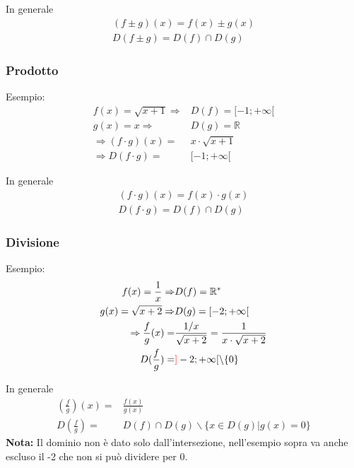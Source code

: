 \documentclass[../main.tex]{subfiles}
\begin{document}
In generale
\begin{align*}
    (f\pm g)(x) = f(x)\pm g(x)\\
    D(f\pm g) = D(f) \cap D(g) 
\end{align*}

\subsubsection{Prodotto}
Esempio:
\begin{align*}
    f(x) = \sqrt{x + 1} \Rightarrow& D(f) = [-1; +\infty[ \\
    g(x) = x \Rightarrow& D(g) = \mathbb{R} \\
    \Rightarrow (f \cdot g)(x) =& x \cdot \sqrt{x + 1} \\
    \Rightarrow D(f \cdot g) =& [-1;+\infty[
\end{align*}

In generale
\begin{align*}
    (f \cdot g)(x) = f(x) \cdot g(x) \\
    D(f \cdot g) = D(f) \cap D(g)  
\end{align*}

\subsubsection{Divisione}
Esempio:
\begin{align*}
    f(x) = \frac{1}{x} \Rightarrow& D(f) = \mathbb{R}^* \\
    g(x) = \sqrt{x + 2} \Rightarrow& D(g) = [-2;+\infty[ \\
    \Rightarrow \frac{f}{g}(x) =& \frac{1/x}{\sqrt{x + 2}} = \frac{1}{x \cdot \sqrt{x + 2}} \\
    D(\frac{f}{g}) =& \color{red}]\color{black}-2;+\infty[\backslash \{0\}
\end{align*}

In generale
\begin{align*}
    (\frac{f}{g})(x) =& \frac{f(x)}{g(x)} \\
    D(\frac{f}{g}) =& D(f) \cap D(g) \backslash \{x \in D(g) | g(x) = 0\}
\end{align*}
\textbf{Nota:} Il dominio non è dato solo dall'intersezione, nell'esempio sopra va anche escluso il -2 che non si può dividere per 0.
\end{document}
